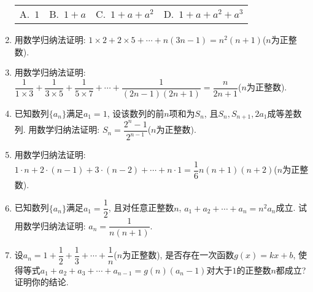 \documentclass[10pt,a4paper]{article}
\newcommand{\fourch}[4]{\par\begin{tabular}{p{.23\textwidth}p{.23\textwidth}p{.23\textwidth}p{.23\textwidth}}
A.~#1 &B.~#2& C.~#3& D.~#4
\end{tabular}}
\begin{document}
\begin{enumerate}[1.]
\fourch{$1$}{$1+a$}{$1+a+a^2$}{$1+a+a^2+a^3$}
\item 用数学归纳法证明: $1\times 2+2\times 5+\cdots+n(3n-1)=n^2(n+1)$($n$为正整数).
\item 用数学归纳法证明: $\dfrac 1{1\times 3}+ \dfrac 1{3\times 5}+ \dfrac 1{5\times 7}+\cdots+\dfrac 1{(2n-1)(2n+1)}= \dfrac n{2n+1}$($n$为正整数).
\item 已知数列$\{a_n\}$满足$a_1=1$, 设该数列的前$n$项和为$S_n$, 且$S_n, S_{n+1}, 2a_1$成等差数列. 用数学归纳法证明: $S_n=\dfrac{2^n-1}{2^{n-1}}$($n$为正整数).
\item 用数学归纳法证明: $1\cdot n+2\cdot (n-1) +3\cdot (n-2)+\cdots+n\cdot 1=\dfrac 16n(n+1)(n+2)$($n$为正整数).
\item 已知数列$\{a_n\}$满足$a_1=\dfrac 12$, 且对任意正整数$n$, $a_1+a_2+\cdots+a_n=n^2a_n$成立. 试用数学归纳法证明: $a_n=\dfrac1{n(n+1)}$.
\item 设$a_n=1+\dfrac 12+\dfrac 13+\cdots+\dfrac 1n$($n$为正整数), 是否存在一次函数$g(x)=kx+b$, 使得等式$a_1+a_2+a_3+\cdots+a_{n-1}=g(n)(a_n-1)$对大于$1$的正整数$n$都成立? 证明你的结论.




\end{enumerate}
\end{document}
